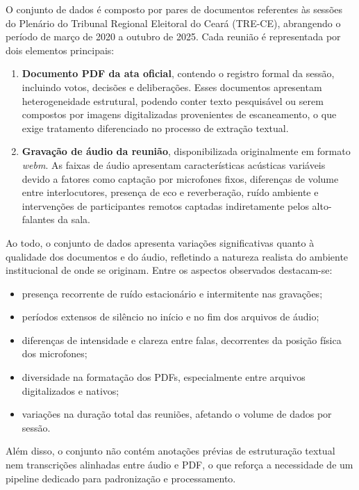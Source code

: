 O conjunto de dados é composto por pares de documentos referentes às sessões do Plenário do Tribunal Regional Eleitoral do Ceará (TRE-CE), abrangendo o período de março de 2020 a outubro de 2025. Cada reunião é representada por dois elementos principais:

\begin{enumerate}
    \item \textbf{Documento PDF da ata oficial}, contendo o registro formal da sessão, incluindo votos, decisões e deliberações. Esses documentos apresentam heterogeneidade estrutural, podendo conter texto pesquisável ou serem compostos por imagens digitalizadas provenientes de escaneamento, o que exige tratamento diferenciado no processo de extração textual.
    
    \item \textbf{Gravação de áudio da reunião}, disponibilizada originalmente em formato \textit{webm}. As faixas de áudio apresentam características acústicas variáveis devido a fatores como captação por microfones fixos, diferenças de volume entre interlocutores, presença de eco e reverberação, ruído ambiente e intervenções de participantes remotos captadas indiretamente pelos alto-falantes da sala.
\end{enumerate}

Ao todo, o conjunto de dados apresenta variações significativas quanto à qualidade dos documentos e do áudio, refletindo a natureza realista do ambiente institucional de onde se originam. Entre os aspectos observados destacam-se:

\begin{itemize}
    \item presença recorrente de ruído estacionário e intermitente nas gravações;
    \item períodos extensos de silêncio no início e no fim dos arquivos de áudio;
    \item diferenças de intensidade e clareza entre falas, decorrentes da posição física dos microfones;
    \item diversidade na formatação dos PDFs, especialmente entre arquivos digitalizados e nativos;
    \item variações na duração total das reuniões, afetando o volume de dados por sessão.
\end{itemize}

Além disso, o conjunto não contém anotações prévias de estruturação textual nem transcrições alinhadas entre áudio e PDF, o que reforça a necessidade de um pipeline dedicado para padronização e processamento.

